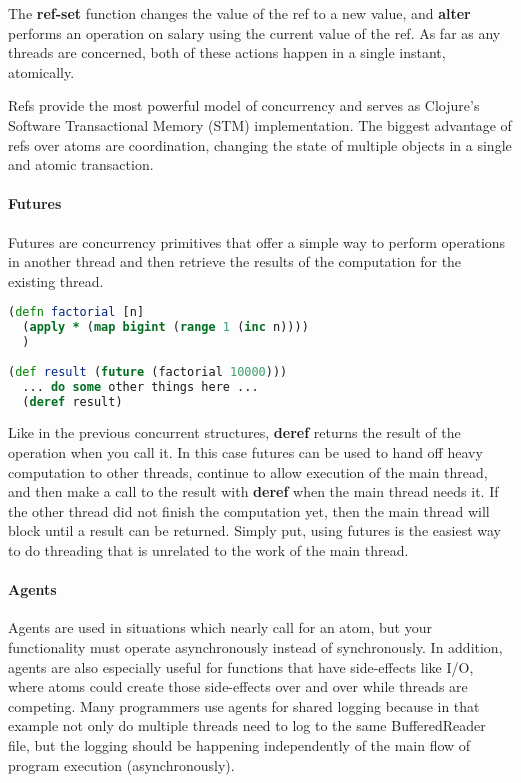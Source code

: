     The \textbf{ref-set} function changes the value of the ref to a new value, and \textbf{alter} performs an operation on salary using the current value of the ref. As far as any threads are concerned, both of these actions happen in a single instant, atomically.
    
    Refs provide the most powerful model of concurrency and serves as Clojure's Software Transactional Memory (STM) implementation. The biggest advantage of refs over atoms are coordination, changing the state of multiple objects in a single and atomic transaction.
    
    \paragraph{Futures}
    
    Futures are concurrency primitives that offer a simple way to perform operations in another thread and then retrieve the results of the computation for the existing thread. 
    
    \begin{lstlisting}[language=clojure]
(defn factorial [n]
  (apply * (map bigint (range 1 (inc n))))
  ) 
    
(def result (future (factorial 10000)))
  ... do some other things here ...
  (deref result)
    \end{lstlisting}
    
    Like in the previous concurrent structures, \textbf{deref} returns the result of the operation when you call it. In this case futures can be used to hand off heavy computation to other threads, continue to allow execution of the main thread, and then make a call to the result with \textbf{deref} when the main thread needs it. If the other thread did not finish the computation yet, then the main thread will block until a result can be returned. Simply put, using futures is the easiest way to do threading that is unrelated to the work of the main thread.
    
    \paragraph{Agents}
    
    Agents are used in situations which nearly call for an atom, but your functionality must operate asynchronously instead of synchronously. In addition, agents are also especially useful for functions that have side-effects like I/O, where atoms could create those side-effects over and over while threads are competing. Many programmers use agents for shared logging because in that example not only do multiple threads need to log to the same BufferedReader file, but the logging should be happening independently of the main flow of program execution (asynchronously).
    
